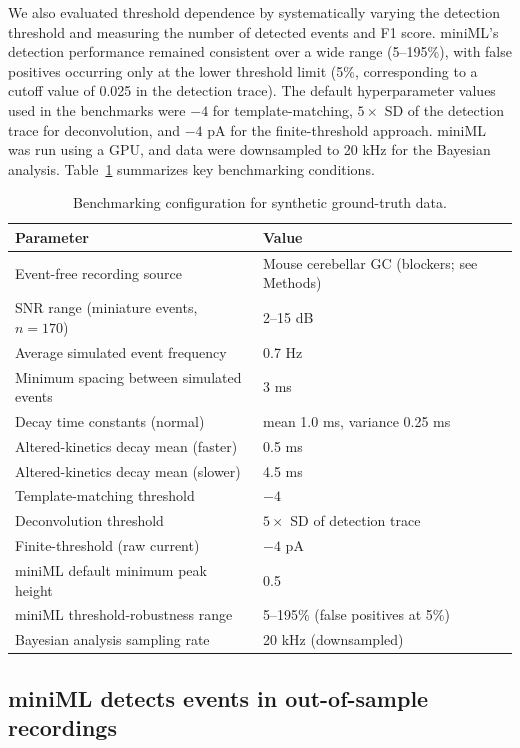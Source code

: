 \documentclass[9pt,lineno]{article}
\begin{document}
We also evaluated threshold dependence by systematically varying the detection threshold and measuring the number of detected events and F1 score. miniML's detection performance remained consistent over a wide range (5--195\%), with false positives occurring only at the lower threshold limit (5\%, corresponding to a cutoff value of 0.025 in the detection trace). The default hyperparameter values used in the benchmarks were $-4$ for template-matching, $5\times$ SD of the detection trace for deconvolution, and $-4$ pA for the finite-threshold approach. miniML was run using a GPU, and data were downsampled to 20 kHz for the Bayesian analysis. Table~\ref{tab:benchmark} summarizes key benchmarking conditions.

\begin{table}[ht]
\centering
\caption{Benchmarking configuration for synthetic ground-truth data.}
\label{tab:benchmark}
\begin{tabular}{ll}
\toprule
Parameter & Value \\
\midrule
Event-free recording source & Mouse cerebellar GC (blockers; see Methods) \\
SNR range (miniature events, $n=170$) & 2--15 dB \\
Average simulated event frequency & 0.7 Hz \\
Minimum spacing between simulated events & 3 ms \\
Decay time constants (normal) & mean 1.0 ms, variance 0.25 ms \\
Altered-kinetics decay mean (faster) & 0.5 ms \\
Altered-kinetics decay mean (slower) & 4.5 ms \\
Template-matching threshold & $-4$ \\
Deconvolution threshold & $5\times$ SD of detection trace \\
Finite-threshold (raw current) & $-4$ pA \\
miniML default minimum peak height & 0.5 \\
miniML threshold-robustness range & 5--195\% (false positives at 5\%) \\
Bayesian analysis sampling rate & 20 kHz (downsampled) \\
\bottomrule
\end{tabular}
\end{table}

\subsection{miniML detects events in out-of-sample recordings}
\end{document}
